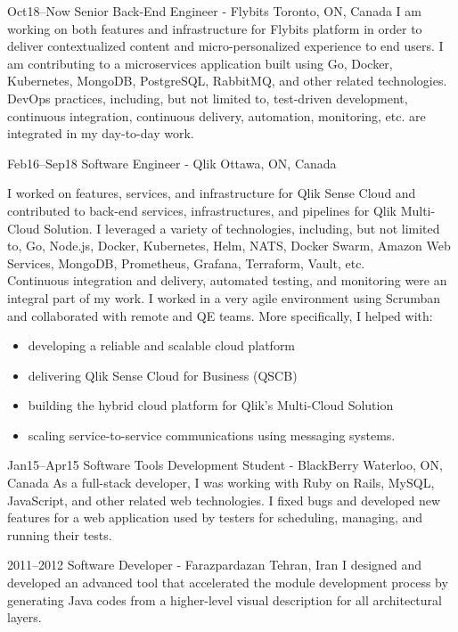 \documentclass[]{cv-style}                     %
\begin{document}
\begin{entrylist}

  \entry
  {\small Oct18--Now}
  {Senior Back-End Engineer - Flybits}
  {Toronto, ON, Canada}
  {I am working on both features and infrastructure for Flybits platform in order to deliver contextualized content and micro-personalized experience to end users.
   I am contributing to a microservices application built using Go, Docker, Kubernetes, MongoDB, PostgreSQL, RabbitMQ, and other related technologies. \\
   DevOps practices, including, but not limited to, test-driven development, continuous integration, continuous delivery, automation, monitoring, etc. are integrated in my day-to-day work.}

  \entry
  {\small Feb16--Sep18}
  {Software Engineer - Qlik}
  {Ottawa, ON, Canada}
  {I worked on features, services, and infrastructure for Qlik Sense Cloud and
   contributed to back-end services, infrastructures, and pipelines for Qlik Multi-Cloud Solution.
   I leveraged a variety of technologies, including, but not limited to, Go, Node.js, Docker, Kubernetes, Helm,
   NATS, Docker Swarm, Amazon Web Services, MongoDB, Prometheus, Grafana, Terraform, Vault, etc. \\
   Continuous integration and delivery, automated testing, and monitoring were an integral part of my work.
   I worked in a very agile environment using Scrumban and collaborated with remote and QE teams.
   More specifically, I helped with:
     \begin{itemize}
         \item developing a reliable and scalable cloud platform
         \item delivering Qlik Sense Cloud for Business (QSCB)
         \item building the hybrid cloud platform for Qlik's Multi-Cloud Solution
         \item scaling service-to-service communications using messaging systems. 
     \end{itemize}
   }

  \entry
  {\small Jan15--Apr15}
  {Software Tools Development Student - BlackBerry}
  {Waterloo, ON, Canada}
  {As a full-stack developer, I was working with Ruby on Rails, MySQL, JavaScript, and other related web technologies.
   I fixed bugs and developed new features for a web application used by testers for scheduling, managing, and running their tests.}

  \entry
  {\small 2011--2012}
  {Software Developer - Farazpardazan}
  {Tehran, Iran}
  {I designed and developed an advanced tool that accelerated the module development process by
   generating Java codes from a higher-level visual description for all architectural layers.}


\end{entrylist}
\end{document}
